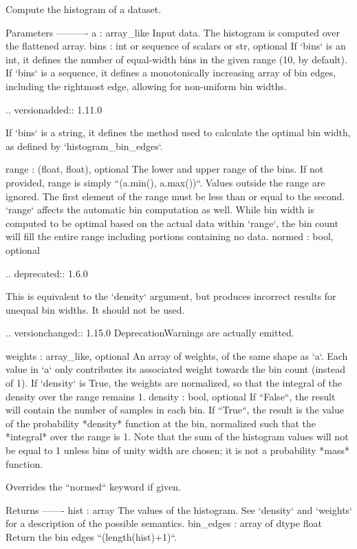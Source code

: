 \begin{DoxyVerb}Compute the histogram of a dataset.

Parameters
----------
a : array_like
    Input data. The histogram is computed over the flattened array.
bins : int or sequence of scalars or str, optional
    If `bins` is an int, it defines the number of equal-width
    bins in the given range (10, by default). If `bins` is a
    sequence, it defines a monotonically increasing array of bin edges,
    including the rightmost edge, allowing for non-uniform bin widths.

    .. versionadded:: 1.11.0

    If `bins` is a string, it defines the method used to calculate the
    optimal bin width, as defined by `histogram_bin_edges`.

range : (float, float), optional
    The lower and upper range of the bins.  If not provided, range
    is simply ``(a.min(), a.max())``.  Values outside the range are
    ignored. The first element of the range must be less than or
    equal to the second. `range` affects the automatic bin
    computation as well. While bin width is computed to be optimal
    based on the actual data within `range`, the bin count will fill
    the entire range including portions containing no data.
normed : bool, optional

    .. deprecated:: 1.6.0

    This is equivalent to the `density` argument, but produces incorrect
    results for unequal bin widths. It should not be used.

    .. versionchanged:: 1.15.0
        DeprecationWarnings are actually emitted.

weights : array_like, optional
    An array of weights, of the same shape as `a`.  Each value in
    `a` only contributes its associated weight towards the bin count
    (instead of 1). If `density` is True, the weights are
    normalized, so that the integral of the density over the range
    remains 1.
density : bool, optional
    If ``False``, the result will contain the number of samples in
    each bin. If ``True``, the result is the value of the
    probability *density* function at the bin, normalized such that
    the *integral* over the range is 1. Note that the sum of the
    histogram values will not be equal to 1 unless bins of unity
    width are chosen; it is not a probability *mass* function.

    Overrides the ``normed`` keyword if given.

Returns
-------
hist : array
    The values of the histogram. See `density` and `weights` for a
    description of the possible semantics.
bin_edges : array of dtype float
    Return the bin edges ``(length(hist)+1)``.



\end{DoxyVerb}
